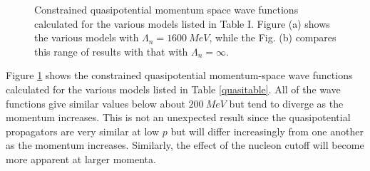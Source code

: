 \documentclass[mythesis.tex]{subfiles}
\begin{document}
\begin{figure}
   \caption{Constrained quasipotential momentum space wave functions
            calculated for the
            various models listed in Table I. Figure (a) shows
            the various models with $\Lambda_n=1600~MeV$, while the
            Fig. (b) compares this range of results with that
            with $\Lambda_n=\infty$.}\label{QPwaves}
\end{figure}

Figure \ref{QPwaves} shows the constrained quasipotential momentum-space
wave functions
calculated for the various models listed in Table \ref{quasitable}. All of
the wave functions give similar values below about $200~MeV$ but tend to
diverge as the momentum increases. This is not an unexpected result since
the quasipotential propagators are very similar at low $p$ but will differ
increasingly from one another as the momentum increases. Similarly, the
effect of the nucleon cutoff will become more apparent at larger momenta.
\end{document}
